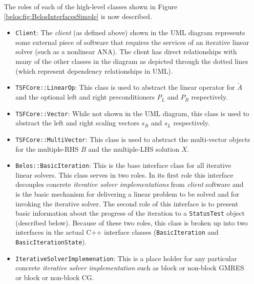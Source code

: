 \documentclass[pdf,ps2pdf,11pt]{SANDreport}
\begin{document}
The roles of each of the high-level classes shown in Figure
{}\ref{belos:fig:BelosInterfacesSimple} is now described.

\begin{itemize}

\item{}\texttt{Client}:
The {}\textit{client} (as defined above) shown in the UML diagram
represents some external piece of software that requires the services
of an iterative linear solver (such as a nonlinear ANA).  The client
has direct relationships with many of the other classes in the diagram
as depicted through the dotted lines (which represent dependency
relationships in UML).

\item{}\texttt{TSFCore::LinearOp}:
This class is used to abstract the linear operator for $\tilde{A}$ and
the optional left and right preconditioners $P_L$ and $P_R$
respectively.

\item{}\texttt{TSFCore::Vector}:
While not shown in the UML diagram, this class is used to abstract the
left and right scaling vectors $s_R$ and $s_L$ respectively.

\item{}\texttt{TSFCore::MultiVector}:
This class is used to abstract the multi-vector objects for the
multiple-RHS $B$ and the multiple-LHS solution $X$.

\item{}\texttt{Belos::BasicIteration}:
This is the base interface class for all iterative linear solvers.
This class serves in two roles.  In its first role this interface
decouples concrete {}\textit{iterative solver implementations} from
{}\textit{client} software and is the basic mechanism for delivering a
linear problem to be solved and for invoking the iterative solver.
The second role of this interface is to present basic information
about the progress of the iteration to a {}\texttt{Status\-Test}
object (described below).  Because of these two roles, this class is
broken up into two interfaces in the actual C++ interface classes
({}\texttt{Basic\-Iteration} and {}\texttt{Basic\-Iteration\-State}).

\item{}\texttt{IterativeSolverImplemenation}:
This is a place holder for any particular concrete {}\textit{iterative
solver implementation} such as block or non-block GMRES or block or
non-block CG.


\end{itemize}
\end{document}
